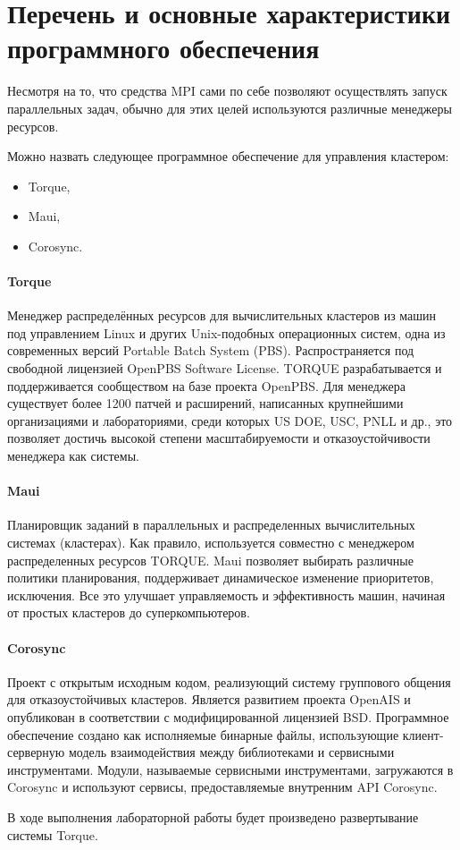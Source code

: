 \section{Перечень и основные характеристики программного обеспечения}

Несмотря на то, что средства MPI сами по себе позволяют осуществлять запуск параллельных задач, обычно для этих целей используются различные менеджеры ресурсов.

Можно назвать следующее программное обеспечение для управления кластером:

\begin{itemize}
	\item Torque,
	\item Maui,
	\item Corosync.
\end{itemize}

\paragraph{Torque}
Менеджер распределённых ресурсов для вычислительных кластеров из машин под управлением Linux и других Unix-подобных операционных систем, одна из современных версий Portable Batch System (PBS). Распространяется под свободной лицензией OpenPBS Software License. TORQUE разрабатывается и поддерживается сообществом на базе проекта OpenPBS. Для менеджера существует более 1200 патчей и расширений, написанных крупнейшими организациями и лабораториями, среди которых US DOE, USC, PNLL и др., это позволяет достичь высокой степени масштабируемости и отказоустойчивости менеджера как системы.

\paragraph{Maui}
Планировщик заданий в параллельных и распределенных вычислительных системах (кластерах). Как правило, используется совместно с менеджером распределенных ресурсов TORQUE.
Maui позволяет выбирать различные политики планирования, поддерживает динамическое изменение приоритетов, исключения. Все это улучшает управляемость и эффективность машин, начиная от простых кластеров до суперкомпьютеров.

\paragraph{Corosync}
Проект с открытым исходным кодом, реализующий систему группового общения для отказоустойчивых кластеров. Является развитием проекта OpenAIS и опубликован в соответствии с модифицированной лицензией BSD. Программное обеспечение создано как исполняемые бинарные файлы, использующие клиент-серверную модель взаимодействия между библиотеками и сервисными инструментами. Модули, называемые сервисными инструментами, загружаются в Corosync и используют сервисы, предоставляемые внутренним API Corosync.

В ходе выполнения лабораторной работы будет произведено развертывание системы Torque.